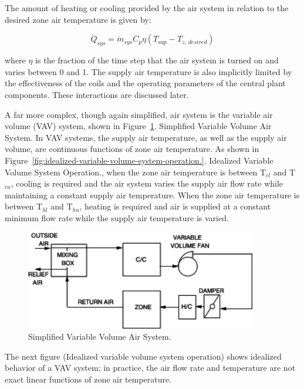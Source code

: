 The amount of heating or cooling provided by the air system in relation to the desired zone air temperature is given by:

\begin{equation}
{\dot Q_{sys}} = {\dot m_{sys}}{C_p}\eta \left( {{T_{\sup }} - {T_{z,\,desired}}} \right)
\end{equation}

where $\eta$ is the fraction of the time step that the air system is turned on and varies between 0 and 1. The supply air temperature is also implicitly limited by the effectiveness of the coils and the operating parameters of the central plant components. These interactions are discussed later.

A far more complex, though again simplified, air system is the variable air volume (VAV) system, shown in Figure~\ref{fig:simplified-variable-volume-air-system.}. Simplified Variable Volume Air System. In VAV systems, the supply air temperature, as well as the supply air volume, are continuous functions of zone air temperature. As shown in Figure~\ref{fig:idealized-variable-volume-system-operation.}. Idealized Variable Volume System Operation., when the zone air temperature is between T\(_{cl}\) and T\(_{cu}\), cooling is required and the air system varies the supply air flow rate while maintaining a constant supply air temperature. When the zone air temperature is between T\(_{hl}\) and T\(_{hu}\), heating is required and air is supplied at a constant minimum flow rate while the supply air temperature is varied.

\begin{figure}[hbtp] %
\centering
\includegraphics[width=0.9\textwidth, height=0.9\textheight, keepaspectratio=true]{media/image33.svg.png}
\caption{Simplified Variable Volume Air System. \protect \label{fig:simplified-variable-volume-air-system.}}
\end{figure}

The next figure (Idealized variable volume system operation) shows idealized behavior of a VAV system; in practice, the air flow rate and temperature are not exact linear functions of zone air temperature.

